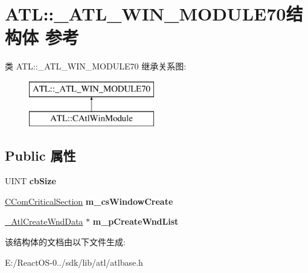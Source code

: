 \hypertarget{struct_a_t_l_1_1___a_t_l___w_i_n___m_o_d_u_l_e70}{}\section{A\+TL\+:\+:\+\_\+\+A\+T\+L\+\_\+\+W\+I\+N\+\_\+\+M\+O\+D\+U\+L\+E70结构体 参考}
\label{struct_a_t_l_1_1___a_t_l___w_i_n___m_o_d_u_l_e70}
类 A\+TL\+:\+:\+\_\+\+A\+T\+L\+\_\+\+W\+I\+N\+\_\+\+M\+O\+D\+U\+L\+E70 继承关系图\+:\begin{figure}[H]
\begin{center}
\leavevmode
\includegraphics[height=2.000000cm]{struct_a_t_l_1_1___a_t_l___w_i_n___m_o_d_u_l_e70}
\end{center}
\end{figure}
\subsection*{Public 属性}
\begin{DoxyCompactItemize}
\item 
\mbox{\label{struct_a_t_l_1_1___a_t_l___w_i_n___m_o_d_u_l_e70_a7def5d3db1482e49a9ea218cce90c593}} 
U\+I\+NT {\bfseries cb\+Size}
\item 
\mbox{\label{struct_a_t_l_1_1___a_t_l___w_i_n___m_o_d_u_l_e70_a081c4db8ff7b1e0012e351d0c8a8cbfb}} 
\hyperlink{class_a_t_l_1_1_c_com_critical_section}{C\+Com\+Critical\+Section} {\bfseries m\+\_\+cs\+Window\+Create}
\item 
\mbox{\label{struct_a_t_l_1_1___a_t_l___w_i_n___m_o_d_u_l_e70_a4ec24c6d7af4080dd9e46f714c78a730}} 
\hyperlink{struct_a_t_l_1_1___atl_create_wnd_data}{\+\_\+\+Atl\+Create\+Wnd\+Data} $\ast$ {\bfseries m\+\_\+p\+Create\+Wnd\+List}
\end{DoxyCompactItemize}


该结构体的文档由以下文件生成\+:\begin{DoxyCompactItemize}
\item 
E\+:/\+React\+O\+S-\/0../sdk/lib/atl/atlbase.\+h\end{DoxyCompactItemize}
